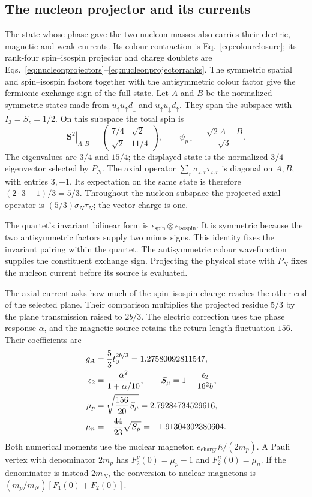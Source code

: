 \documentclass[aps,prx,onecolumn,10pt,notitlepage,nofootinbib,longbibliography]{revtex4-2}
\numberwithin{equation}{section}
\numberwithin{table}{section}
\begin{document}
\subsection{The nucleon projector and its currents}
The state whose phase gave the two nucleon masses also carries their electric, magnetic and weak currents. Its colour contraction is Eq.~\eqref{eq:colourclosure}; its rank-four spin--isospin projector and charge doublets are Eqs.~\eqref{eq:nucleonprojectors}--\eqref{eq:nucleonprojectorranks}. The symmetric spatial and spin--isospin factors together with the antisymmetric colour factor give the fermionic exchange sign of the full state. Let $A$ and $B$ be the normalized symmetric states made from $u_\uparrow u_\uparrow d_\downarrow$ and $u_\uparrow u_\downarrow d_\uparrow$. They span the subspace with $I_3=S_z=1/2$. On this subspace the total spin is
\begin{equation}
 \left.\mathbf S^2\right|_{A,B}=
 \begin{pmatrix}7/4&\sqrt2\\ \sqrt2&11/4\end{pmatrix},
 \qquad
 \psi_{p\uparrow}=\frac{\sqrt2A-B}{\sqrt3}.
 \label{eq:nucleonspinmatrix}
\end{equation}
The eigenvalues are $3/4$ and $15/4$; the displayed state is the normalized $3/4$ eigenvector selected by $P_N$. The axial operator $\sum_r\sigma_{z,r}\tau_{z,r}$ is diagonal on $A,B$, with entries $3,-1$. Its expectation on the same state is therefore $(2\cdot3-1)/3=5/3$. Throughout the nucleon subspace the projected axial operator is $(5/3)\sigma_N\tau_N$; the vector charge is one.

The quartet's invariant bilinear form is $\epsilon_{\mathrm{spin}}\otimes\epsilon_{\mathrm{isospin}}$. It is symmetric because the two antisymmetric factors supply two minus signs. This identity fixes the invariant pairing within the quartet. The antisymmetric colour wavefunction supplies the constituent exchange sign. Projecting the physical state with $P_N$ fixes the nucleon current before its source is evaluated.

The axial current asks how much of the spin--isospin change reaches the other end of the selected plane. Their comparison multiplies the projected residue $5/3$ by the plane transmission raised to $2b/3$. The electric correction uses the phase response $\alpha$, and the magnetic source retains the return-length fluctuation $156$. Their coefficients are
\begin{align}
 g_A&=\frac53t_0^{2b/3}=1.27580092811547,\notag\\
 \epsilon_2&=\frac{\alpha^2}{1+\alpha/10},\qquad
 S_\mu=1-\frac{\epsilon_2}{16^2b},\notag\\
 \mu_p&=\sqrt{\frac{156}{20}S_\mu}=2.79284734529616,\notag\\
 \mu_n&=-\frac{44}{23}\sqrt{S_\mu}=-1.91304302380604.
 \label{eq:nucleoncurrent}
\end{align}
Both numerical moments use the nuclear magneton $e_{\mathrm{charge}}\hbar/(2m_p)$. A Pauli vertex with denominator $2m_p$ has $F_2^p(0)=\mu_p-1$ and $F_2^n(0)=\mu_n$. If the denominator is instead $2m_N$, the conversion to nuclear magnetons is $(m_p/m_N)[F_1(0)+F_2(0)]$.
\end{document}

